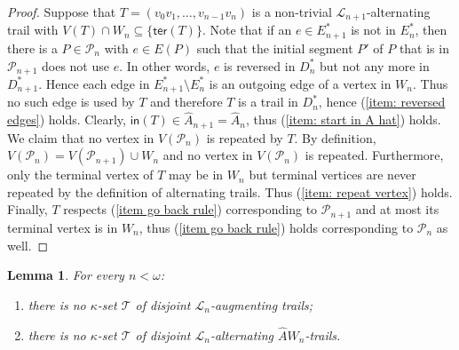 \documentclass[12pt,a4paper]{amsart}
\theoremstyle{plain}
\newtheorem{lemma}[theorem]{Lemma}
\theoremstyle{definition}
\begin{document}
\begin{proof}
Suppose that $ T=(v_0v_1,\dots, v_{n-1}v_n) $  is a non-trivial $ \mathcal{L}_{n+1} $-alternating trail with $ V(T)\cap 
W_n 
\subseteq \{ \mathsf{ter}(T) \} 
$. Note that if an  $ e\in E_{n+1}^{*} $ is not in $ E_{n}^{*}$,  then there is a $ P\in \mathcal{P}_n $ with  $e\in E(P) $ such that the 
initial 
segment $ P' $ of $ P $ that is in $  \mathcal{P}_{n+1} $ does not 
use $ e $. In other words, $ e $ is reversed in $ D^{*}_n $ but not any more in $ D^{*}_{n+1} $. Hence each edge in $ E_{n+1}^{*}\setminus 
E_{n}^{*} $ is an outgoing edge of a vertex in $ W_n $.   Thus no such edge is used by $ T 
$ and therefore $ 
T $ is a trail in $ D^{*}_{n} $, hence (\ref{item: reversed edges}) holds.  Clearly,  $ \mathsf{in}(T)\in 
\widehat{A}_{n+1}=\widehat{A}_{n} $, 
thus (\ref{item: start in A hat}) holds. We claim that no vertex in $ V(\mathcal{P}_n) $ is repeated by $ T $.  By definition, $ V(\mathcal{P}_n)= 
V(\mathcal{P}_{n+1})\cup W_n 
$ and no vertex in $ V(\mathcal{P}_n) $ is repeated.  Furthermore, only the terminal vertex of $ T $ may be in $ W_n $ but 
terminal vertices are never repeated by the definition of alternating trails. Thus (\ref{item: repeat vertex}) holds. Finally, $ T $ respects (\ref{item 
go back rule}) corresponding to $ \mathcal{P}_{n+1} $ and at most its terminal vertex is in $ W_n $, thus (\ref{item 
go back rule}) holds corresponding to $ \mathcal{P}_n $ as well.
\end{proof}
\begin{lemma}\label{lem: key lemma}
For every $ n<\omega $:
\begin{enumerate}[label=(\roman*)]
\item[$ (i_n) $]\label{item: no kappa aug} there is no $ \kappa $-set $ \mathcal{T} $ of disjoint $ \mathcal{L}_n $-augmenting trails;
\item[$ (ii_n) $]\label{item: few meets Wn} there is no $ \kappa $-set $ \mathcal{T} $ of disjoint $ \mathcal{L}_n 
$-alternating $ \widehat{A}W_n$-trails.
\end{enumerate}
\end{lemma}
\end{document}
